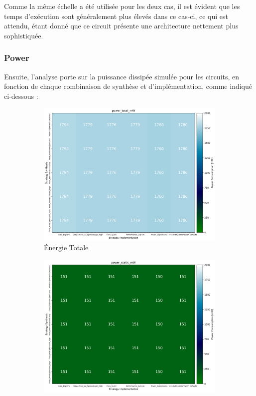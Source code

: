 \documentclass[../CSC_5RO07_TA.tex]{subfiles}
\begin{document}
\noindent Comme la même échelle a été utilisée pour les deux cas, il est évident que les temps d'exécution sont généralement plus élevés dans ce cas-ci, ce qui est attendu, étant donné que ce circuit présente une architecture nettement plus sophistiquée.


\subsubsection{Power}
\noindent Ensuite, l'analyse porte sur la puissance dissipée simulée pour les circuits, en fonction de chaque combinaison de synthèse et d'implémentation, comme indiqué ci-dessous :
\begin{figure}[h]
    \centering
    \begin{subfigure}[b]{0.30\textwidth}
        \centering
        \includegraphics[width=\linewidth]{images/3_power_total_mW.png}
        \caption{Énergie Totale}
        \label{fig:power_total_3}
    \end{subfigure}\hfill
	\begin{subfigure}[b]{0.30\textwidth}
        \centering
        \includegraphics[width=\linewidth]{images/3_power_static_mW.png}

\end{subfigure}
\end{figure}
\end{document}
